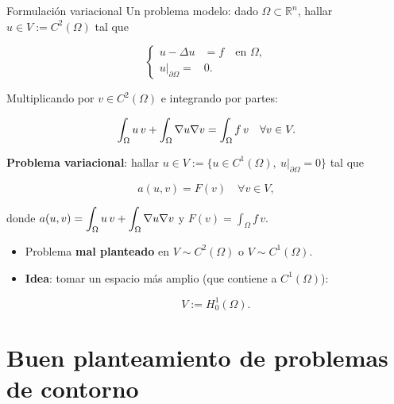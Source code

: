 \documentclass[9pt,leqno]{beamer}
\begin{document}
\begin{frame}{Formulación variacional}
  Un problema modelo: dado $\Omega\subset\mathbb{R}^n$, hallar
  $u\in V:=C^2(\Omega)$ tal que
  \begin{block}{}
    \vspace{-1.1ex}
    \begin{equation*}
      \left\{
        \label{eq:1}
        \begin{aligned}
          u - \Delta u &= f \quad\text{en } \Omega,  \\
          u | _{\partial\Omega} =& 0.
        \end{aligned}
      \right.
    \end{equation*}
  \end{block}
  Multiplicando por $v\in C^2(\Omega)$ e integrando por partes:
  \begin{block}{}
    \vspace{-1.1ex}
    \begin{equation*}
      \label{eq:2}
      \int_\Omega u\,v + \int_\Omega\nabla u \nabla v = \int_\Omega f\,v
      \quad\forall v\in V.
    \end{equation*}
  \end{block}
  \textbf{Problema variacional}: hallar
  $u\in V:= \{u\in C^1(\Omega),\ u|_{\partial\Omega}=0\}$ tal que
  \begin{block}{}
    \vspace{-2.9ex}
    \begin{equation}
      \label{eq:pb.variacional}
      \tag{P}
    a(u,v)= F(v) \quad \forall v \in V,
  \end{equation}
  \end{block}
  \vspace{1ex} donde
  $\displaystyle a(u,v)=\int_\Omega u\,v + \int_\Omega\nabla u \nabla v$
  \quad y \quad $\displaystyle F(v) = \int_\Omega f\,v$.
  \begin{itemize}
  \item Problema \textbf{mal planteado} en $V\sim C^2(\Omega)$ o
    $V \sim C^1(\Omega)$.
  \item \textbf{Idea}: tomar un espacio más amplio (que contiene a $C^1(\Omega)$):
  \begin{block}{}
    \vspace{-1ex}
    $$
    V:=H_0^1(\Omega).
    $$
  \end{block}
\end{itemize}
\end{frame}

\section{Buen planteamiento de problemas de contorno}
\label{sec:buen-plant-de}
\end{document}
